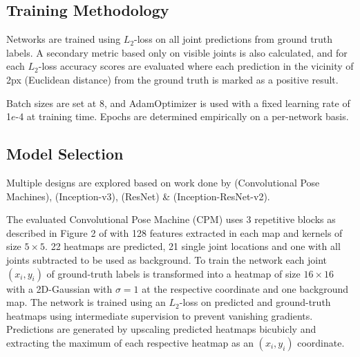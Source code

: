 \subsection{Training Methodology}
Networks are trained using $L_2$-loss on all joint predictions from ground truth labels. A secondary metric based only on visible joints is also calculated, and for each $L_2$-loss accuracy scores are evaluated where each prediction in the vicinity of 2px (Euclidean distance) from the ground truth is marked as a positive result.

Batch sizes are set at 8, and AdamOptimizer is used with a fixed learning rate of 1$e$-4 at training time. Epochs are determined empirically on a per-network basis.

\subsection{Model Selection}
Multiple designs are explored based on work done by \citeauthor{DBLP:journals/corr/WeiRKS16} (Convolutional Pose Machines), \citeauthor{DBLP:journals/corr/SzegedyVISW15} (Inception-v3), \citeauthor{DBLP:journals/corr/HeZRS15} (ResNet) \& \citeauthor{DBLP:journals/corr/SzegedyIV16} (Inception-ResNet-v2).

The evaluated Convolutional Pose Machine (CPM) uses 3 repetitive blocks as described in Figure 2 of \cite{DBLP:journals/corr/WeiRKS16} with 128 features extracted in each map and kernels of size $5 \times 5$. 22 heatmaps are predicted, 21 single joint locations and one with all joints subtracted to be used as background. To train the network each joint $(x_i, y_i)$ of ground-truth labels is transformed into a heatmap of size $16 \times 16$ with a 2D-Gaussian with $\sigma = 1$ at the respective coordinate and one background map. The network is trained using an $L_2$-loss on predicted and ground-truth heatmaps using intermediate supervision to prevent vanishing gradients. Predictions are generated by upscaling predicted heatmaps bicubicly and extracting the maximum of each respective heatmap as an $(x_i, y_i)$ coordinate.

